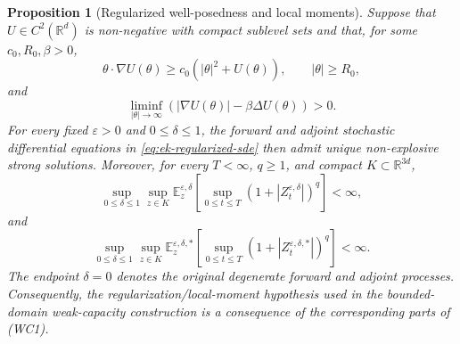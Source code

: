 \documentclass[11pt]{article}
\numberwithin{equation}{section}
\theoremstyle{plain}
\newtheorem{proposition}[theorem]{Proposition}
\theoremstyle{definition}
\theoremstyle{remark}
\newcommand{\R}{\mathbb R}
\newcommand{\eps}{\varepsilon}
\newcommand{\E}{\mathbb E}
\begin{document}
\begin{proposition}[Regularized well-posedness and local moments]
\label{prop:wc-regularized}
Suppose that $U\in C^2(\R^d)$ is non-negative with compact sublevel sets and
that, for some $c_0,R_0,\beta>0$,
\[
\theta\cdot\nabla U(\theta)
\ge c_0\left(|\theta|^2+U(\theta)\right),
\qquad |\theta|\ge R_0,
\]
and
\[
\liminf_{|\theta|\to\infty}
\left(|\nabla U(\theta)|-\beta\Delta U(\theta)\right)>0.
\]
For every fixed $\eps>0$ and $0\le\delta\le1$, the forward and adjoint
stochastic differential equations in \eqref{eq:ek-regularized-sde} then admit
unique non-explosive strong solutions.
Moreover, for every $T<\infty$, $q\ge1$, and compact
$K\subset\R^{3d}$,
\[
\sup_{0\le\delta\le1}\sup_{z\in K}
\E_z^{\eps,\delta}\left[
\sup_{0\le t\le T}\left(1+\left|Z_t^{\eps,\delta}\right|\right)^q
\right]<\infty,
\]
and
\[
\sup_{0\le\delta\le1}\sup_{z\in K}
\E_z^{\eps,\delta,*}\left[
\sup_{0\le t\le T}\left(1+\left|Z_t^{\eps,\delta,*}\right|\right)^q
\right]<\infty.
\]
The endpoint $\delta=0$ denotes the original degenerate forward and adjoint
processes.  Consequently, the regularization/local-moment hypothesis used in
the bounded-domain weak-capacity construction is a consequence of the
corresponding parts of \textup{(WC1)}.
\end{proposition}
\end{document}
